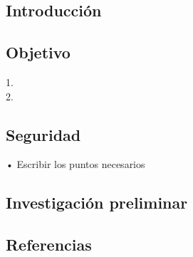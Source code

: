 \subsection{Introducción }


\subsection{Objetivo}


1.	\\
2.  \\


\subsection{Seguridad}


• Escribir los puntos necesarios

\subsection{Investigación preliminar}


\subsection{Referencias}